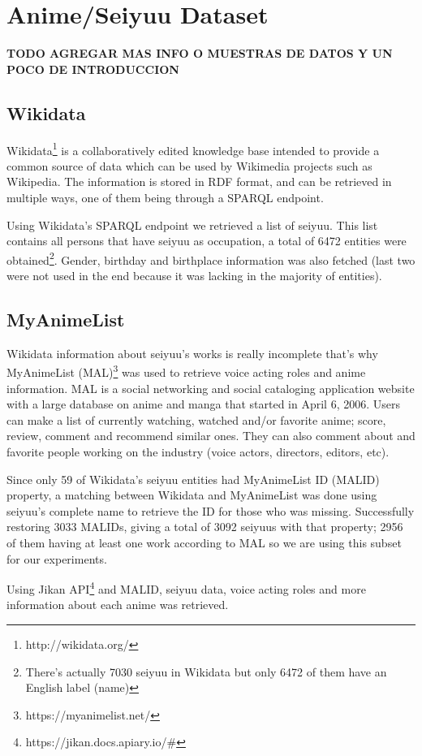 \chapter{Anime/Seiyuu Dataset}

\textbf{TODO AGREGAR MAS INFO O MUESTRAS DE DATOS Y UN POCO DE INTRODUCCION}

\section{Wikidata}
Wikidata\footnote{http://wikidata.org/} is a collaboratively edited knowledge base intended to provide a common source of data which can be used by Wikimedia projects such as Wikipedia. The information is stored in RDF format, and can be retrieved in multiple ways, one of them being through a SPARQL endpoint.

Using Wikidata's SPARQL endpoint we retrieved a list of seiyuu. This list contains all persons that have seiyuu as occupation, a total of 6472 entities were obtained\footnote{There's actually 7030 seiyuu in Wikidata but only 6472 of them have an English label (name)}. Gender, birthday and birthplace information was also fetched (last two were not used in the end because it was lacking in the majority of entities).

\section{MyAnimeList}
Wikidata information about seiyuu's works is really incomplete that's why MyAnimeList (MAL)\footnote{https://myanimelist.net/} was used to retrieve voice acting roles and anime information. MAL is a social networking and social cataloging application website with a large database on anime and manga that started in April 6, 2006. Users can make a list of currently watching, watched and/or favorite anime; score, review, comment and recommend similar ones. They can also comment about and favorite people working on the industry (voice actors, directors, editors, etc).

Since only 59 of Wikidata's seiyuu entities had MyAnimeList ID (MALID) property, a matching between Wikidata and MyAnimeList was done using seiyuu's complete name to retrieve the ID for those who was missing. Successfully restoring 3033 MALIDs, giving a total of 3092 seiyuus with that property; 2956 of them having at least one work according to MAL so we are using this subset for our experiments.

Using Jikan API\footnote{https://jikan.docs.apiary.io/\#} and MALID, seiyuu data, voice acting roles and more information about each anime was retrieved. 

